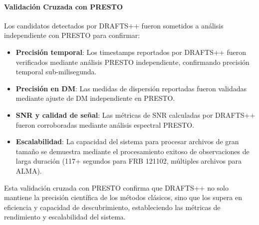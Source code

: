\paragraph{Validación Cruzada con PRESTO}

Los candidatos detectados por DRAFTS++ fueron sometidos a análisis independiente con PRESTO para confirmar:
\begin{itemize}
    \item \textbf{Precisión temporal}: Los timestamps reportados por DRAFTS++ fueron verificados mediante análisis PRESTO independiente, confirmando precisión temporal sub-milisegunda.
    \item \textbf{Precisión en DM}: Las medidas de dispersión reportadas fueron validadas mediante ajuste de DM independiente en PRESTO.
    \item \textbf{SNR y calidad de señal}: Las métricas de SNR calculadas por DRAFTS++ fueron corroboradas mediante análisis espectral PRESTO.
    \item \textbf{Escalabilidad}: La capacidad del sistema para procesar archivos de gran tamaño se demuestra mediante el procesamiento exitoso de observaciones de larga duración (117+ segundos para FRB 121102, múltiples archivos para ALMA).
\end{itemize}

Esta validación cruzada con PRESTO confirma que DRAFTS++ no solo mantiene la precisión científica de los métodos clásicos, sino que los supera en eficiencia y capacidad de descubrimiento, estableciendo las métricas de rendimiento y escalabilidad del sistema.



